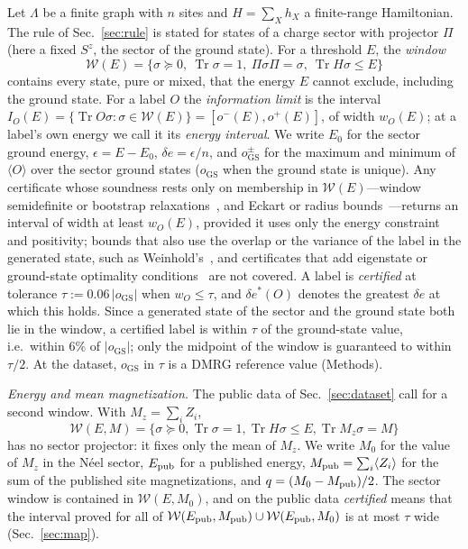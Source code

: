 \documentclass[aps,prx,twocolumn,10pt,superscriptaddress,nofootinbib,longbibliography,floatfix]{revtex4-2}
\theoremstyle{remark}
\newcommand{\de}{\delta e}
\newcommand{\des}{\delta e^{*}}
\newcommand{\W}{\mathcal{W}}
\newcommand{\Tr}{\operatorname{Tr}}
\newcommand{\GS}{\mathrm{GS}}
\begin{document}
Let $\Lambda$ be a finite graph with $n$ sites and $H=\sum_X h_X$ a finite-range Hamiltonian. The rule of
Sec.~\ref{sec:rule} is stated for states of a charge sector with projector $\Pi$ (here a fixed $S^z$, the sector of
the ground state). For a threshold $E$, the \emph{window}
\begin{equation}
\W(E)=\{\sigma\succeq0,\ \Tr\sigma=1,\ \Pi\sigma\Pi=\sigma,\ \Tr H\sigma\le E\} %
\label{eq:window}
\end{equation}
contains every state, pure or mixed, that the energy $E$ cannot exclude, including the ground state. For a label $O$
the \emph{information limit} is the interval $I_O(E)=\{\Tr O\sigma:\sigma\in\W(E)\}=[o^-(E),o^+(E)]$, of width
$w_O(E)$; at a label's own energy we call it its \emph{energy interval}. We write $E_0$ for the sector ground energy, $\epsilon=E-E_0$, $\de=\epsilon/n$, and $o_\GS^\pm$ for the maximum
and minimum of $\langle O\rangle$ over the sector ground states ($o_\GS$ when the ground state is unique). Any certificate whose
soundness rests only on membership in $\W(E)$---window semidefinite or bootstrap
relaxations~\cite{wang2024prx,wang2026scipost,vallee2026,banerjee2026}, and Eckart or radius
bounds~\cite{eckart1930,manchanda2026}---returns an interval of width at least $w_O(E)$, provided it
uses only the energy constraint and positivity; bounds that also use the overlap or the variance of the label in the
generated state, such as Weinhold's~\cite{weinhold1968}, and certificates that add eigenstate or ground-state optimality
conditions~\cite{araujo2023,fawzi2024,scheer2025} are not covered. A label is \emph{certified} at tolerance $\tau:=0.06\,|o_\GS|$ when %
$w_O\le\tau$, and $\des(O)$ denotes the greatest $\de$ at which this holds. Since a generated state of the sector and
the ground state both lie in the window, a certified label is within $\tau$ of the ground-state value, i.e.\ within $6\%$ of %
$|o_\GS|$; only the midpoint of the window is guaranteed to within $\tau/2$. At the dataset, $o_\GS$ in $\tau$ is a
DMRG reference value (Methods).

\emph{Energy and mean magnetization.} The public data of Sec.~\ref{sec:dataset} call for a second window. With
$M_z=\sum_iZ_i$,
\begin{equation}
\W(E,M)=\{\sigma\succeq0,\Tr\sigma=1,\Tr H\sigma\le E,\Tr M_z\sigma=M\} %
\label{eq:windowM}
\end{equation}
has no sector projector: it fixes only the mean of $M_z$. We write $M_0$ for the value of $M_z$ in the N\'eel
sector, $E_{\rm pub}$ for a published energy, $M_{\rm pub}=\sum_i\langle Z_i\rangle$ for the sum of the published site
magnetizations, and $q=(M_0-M_{\rm pub})/2$. The
sector window is contained in $\W(E,M_0)$, and on the public data \emph{certified} means that the interval proved
for all of $\W(E_{\rm pub},M_{\rm pub})\cup\W(E_{\rm pub},M_0)$ is at most $\tau$ wide (Sec.~\ref{sec:map}).
\end{document}
